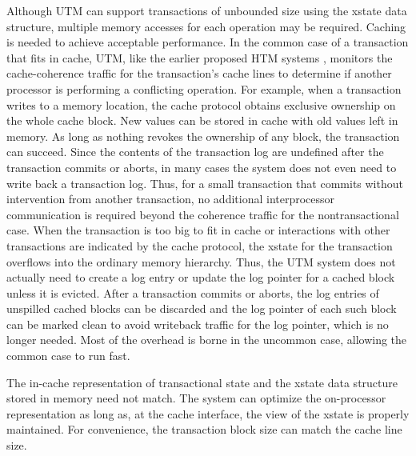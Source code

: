 

Although UTM can support transactions of unbounded size using the
xstate data structure, multiple memory accesses for each operation may
be required.  Caching is needed to achieve acceptable performance.  In
the common case of a transaction that fits in cache, UTM, like the
earlier proposed HTM systems \cite{Knight86,HerlihyMo93}, monitors the
cache-coherence traffic for the transaction's cache lines to determine
if another processor is performing a conflicting operation.  For
example, when a transaction writes to a memory location, the cache
protocol obtains exclusive ownership on the whole cache block.  New
values can be stored in cache with old values left in memory.  As long
as nothing revokes the ownership of any block, the transaction can
succeed.  Since the contents of the transaction log are undefined
after the transaction commits or aborts, in many cases the system does
not even need to write back a transaction log.  Thus, for a small
transaction that commits without intervention from another
transaction, no additional interprocessor communication is required
beyond the coherence traffic for the nontransactional case.  When the
transaction is too big to fit in cache or interactions with other
transactions are indicated by the cache protocol, the xstate for the
transaction overflows into the ordinary memory hierarchy.  Thus, the
UTM system does not actually need to create a log entry or update
the log pointer for a cached block unless it is evicted.  After a
transaction commits or aborts, the log entries of unspilled cached
blocks can be discarded and the log pointer of each such block can be
marked clean to avoid writeback traffic for the log pointer, which is
no longer needed.  Most of the overhead is borne in the uncommon case,
allowing the common case to run fast.

The in-cache representation of transactional state and the xstate data
structure stored in memory need not match.  The system can optimize
the on-processor representation as long as, at the cache interface, the
view of the xstate is properly maintained.  For convenience, the
transaction block size can match the cache line size.


